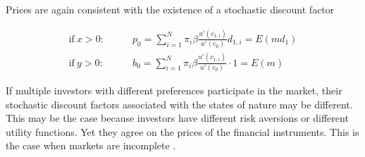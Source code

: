 \bigskip

\noindent Prices are again consistent with the existence of a stochastic discount factor

\begin{align}
    \text{if}\ x>0: \qquad &p_0 = \sum_{i=1}^{N} \pi_i \beta \frac{u'(c_{1,i})}{u'(c_0)} d_{1,i} = E(md_1)\\
    \text{if}\ y>0: \qquad &b_0 = \sum_{i=1}^{N} \pi_i \beta \frac{u'(c_{1,i})}{u'(c_0)} \cdot 1 = E(m)
\end{align}

\bigskip

\noindent If multiple investors with different preferences participate in the market, their stochastic discount factors associated with the states of nature may be different. This may be the case because investors have different risk aversions or different utility functions. Yet they agree on the prices of the financial instruments. This is the case when markets are incomplete \citep{dangl2021notes}. 
